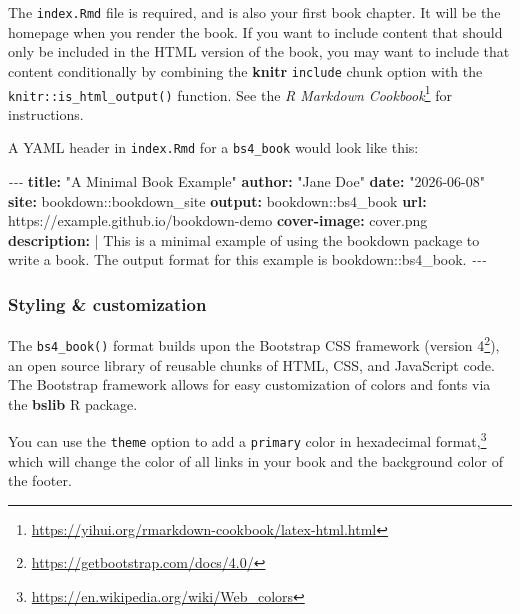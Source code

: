 \documentclass[
  12pt,
]{krantz}
\newenvironment{Shaded}{\begin{snugshade}}{\end{snugshade}}
\newcommand{\AttributeTok}[1]{\textcolor[rgb]{0.13,0.29,0.53}{#1}}
\newcommand{\CharTok}[1]{\textcolor[rgb]{0.31,0.60,0.02}{#1}}
\newcommand{\FunctionTok}[1]{\textcolor[rgb]{0.13,0.29,0.53}{\textbf{#1}}}
\newcommand{\KeywordTok}[1]{\textcolor[rgb]{0.13,0.29,0.53}{\textbf{#1}}}
\newcommand{\NormalTok}[1]{#1}
\newcommand{\PreprocessorTok}[1]{\textcolor[rgb]{0.56,0.35,0.01}{\textit{#1}}}
\newcommand{\StringTok}[1]{\textcolor[rgb]{0.31,0.60,0.02}{#1}}
\renewcommand{\href}[2]{#2\footnote{\url{#1}}}
\theoremstyle{definition}
\theoremstyle{definition}
\theoremstyle{definition}
\theoremstyle{definition}
\theoremstyle{remark}
\begin{document}
The \texttt{index.Rmd} file is required, and is also your first book chapter. It will be the homepage when you render the book. If you want to include content that should only be included in the HTML version of the book, you may want to include that content conditionally by combining the \textbf{knitr} \texttt{include} chunk option with the \texttt{knitr::is\_html\_output()} function. See the \href{https://yihui.org/rmarkdown-cookbook/latex-html.html}{\emph{R Markdown Cookbook}} for instructions.

A YAML header in \texttt{index.Rmd} for a \texttt{bs4\_book} would look like this:

\begin{Shaded}
\begin{Highlighting}[]
\PreprocessorTok{{-}{-}{-}}
\FunctionTok{title}\KeywordTok{:}\AttributeTok{ }\StringTok{"A Minimal Book Example"}
\FunctionTok{author}\KeywordTok{:}\AttributeTok{ }\StringTok{"Jane Doe"}
\FunctionTok{date}\KeywordTok{:}\AttributeTok{ }\StringTok{"2026{-}06{-}08"}
\FunctionTok{site}\KeywordTok{:}\AttributeTok{ bookdown::bookdown\_site}
\FunctionTok{output}\KeywordTok{:}\AttributeTok{ bookdown::bs4\_book}
\FunctionTok{url}\KeywordTok{:}\AttributeTok{ https://example.github.io/bookdown{-}demo}
\FunctionTok{cover{-}image}\KeywordTok{:}\AttributeTok{ cover.png}
\FunctionTok{description}\KeywordTok{: }\CharTok{|}
\NormalTok{  This is a minimal example of using the bookdown package to write a book.}
\NormalTok{  The output format for this example is bookdown::bs4\_book.}
\PreprocessorTok{{-}{-}{-}}
\end{Highlighting}
\end{Shaded}

\subsubsection{Styling \& customization}\label{styling-customization}

The \texttt{bs4\_book()} format builds upon the Bootstrap CSS framework (\href{https://getbootstrap.com/docs/4.0/}{version 4}), an open source library of reusable chunks of HTML, CSS, and JavaScript code. The Bootstrap framework allows for easy customization of colors and fonts via the \textbf{bslib} R package.

You can use the \texttt{theme} option to add a \texttt{primary} color in \href{https://en.wikipedia.org/wiki/Web_colors}{hexadecimal format,} which will change the color of all links in your book and the background color of the footer.
\end{document}
